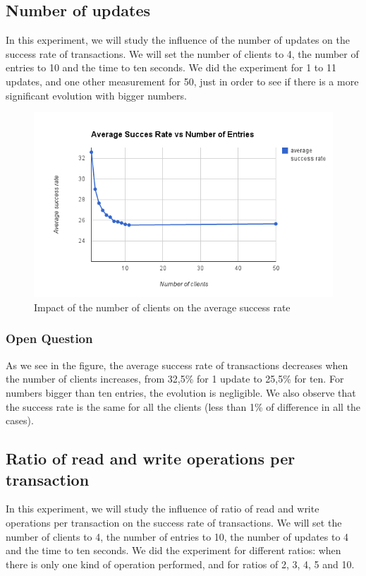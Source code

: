 \documentclass[a4paper, 11pt]{article}
\begin{document}
\subsection{Number of updates}
In this experiment, we will study the influence of the number of updates on the success rate of transactions. We will set the number of clients to 4, the number of entries to 10 and the time to ten seconds. We did the experiment for 1 to 11 updates, and one other measurement for 50, just in order to see if there is a more significant evolution with bigger numbers.

\begin{figure}[H]
\begin{center}
\includegraphics[scale=0.5]{exp3.png}
\caption{Impact of the number of clients on the average success rate}
\end{center}
\end{figure}

\subsubsection{Open Question}
As we see in the figure, the average success rate of transactions decreases when the number of clients increases, from 32,5\% for 1 update to 25,5\% for ten. For numbers bigger than ten entries, the evolution is negligible. We also observe that the success rate is the same for all the clients (less than 1\% of difference in all the cases).


\subsection{Ratio of read and write operations per transaction}
In this experiment, we will study the influence of ratio of read and write operations per transaction on the success rate of transactions. We will set the number of clients to 4, the number of entries to 10, the number of updates to 4 and the time to ten seconds. We did the experiment for different ratios: when there is only one kind of operation performed, and for ratios of 2, 3, 4, 5 and 10.
\end{document}
